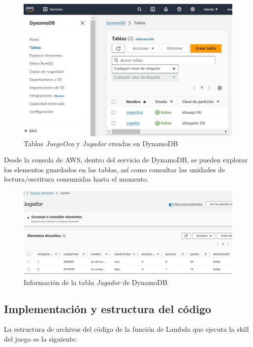 \begin{figure}[H]
	\centering
	\includegraphics[width=1\textwidth]{imgs/aws-db-1.jpg}
	\caption{Tablas \textit{JuegoOca} y \textit{Jugador} creadas en DynamoDB}
	\label{fig:aws-db-1}
\end{figure}

Desde la consola de AWS, dentro del servicio de DynamoDB, se pueden explorar los elementos guardados en las tablas, así como consultar las unidades de lectura/escritura consumidas hasta el momento.

\begin{figure}[H]
	\centering
	\includegraphics[width=1\textwidth]{imgs/aws-db-2.jpg}
	\caption{Información de la tabla \textit{Jugador} de DynamoDB}
	\label{fig:aws-db-2}
\end{figure}

\subsection{Implementación y estructura del código}

La estructura de archivos del código de la función de Lambda que ejecuta la skill del juego es la siguiente:

